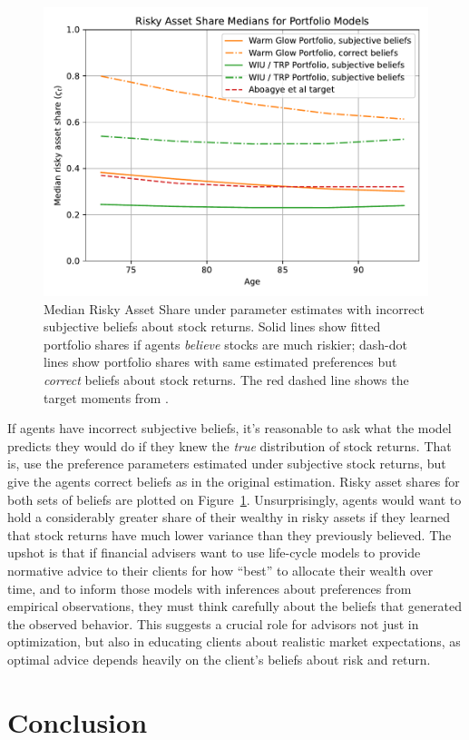 \documentclass{article}
\begin{document}
\begin{figure}[!htbp]
\centering
\includegraphics[width=0.7\linewidth]{files/StockBeliefsShare-2e873b7c6e2985ba497973cccbbffc8b.pdf}
\caption[]{Median Risky Asset Share under parameter estimates with incorrect subjective beliefs about stock returns. Solid lines show fitted portfolio shares if agents \textit{believe} stocks are much riskier; dash-dot lines show portfolio shares with same estimated preferences but \textit{correct} beliefs about stock returns. The red dashed line shows the target moments from \cite{Aboagye2024}.}
\label{subjbeliefs}
\end{figure}

If agents have incorrect subjective beliefs, it's reasonable to ask what the model predicts they would do if they knew the \textit{true} distribution of stock returns.
That is, use the preference parameters estimated under subjective stock returns, but give the agents correct beliefs as in the original estimation.
Risky asset shares for both sets of beliefs are plotted on Figure~\ref{subjbeliefs}.
Unsurprisingly, agents would want to hold a considerably greater share of their wealthy in risky assets if they learned that stock returns have much lower variance than they previously believed.
The upshot is that if financial advisers want to use life-cycle models to provide normative advice to their clients for how ``best'' to allocate their wealth over time, and to inform those models with inferences about preferences from empirical observations, they must think carefully about the beliefs that generated the observed behavior. This suggests a crucial role for advisors not just in optimization, but also in educating clients about realistic market expectations, as optimal advice depends heavily on the client's beliefs about risk and return.

\section{Conclusion}
\end{document}
